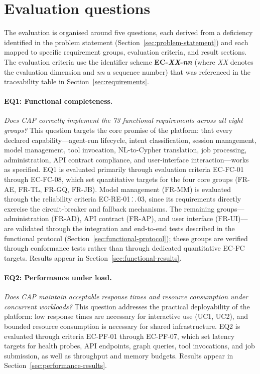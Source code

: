 \documentclass[a4paper,noexaminfo]{sapthesis}
\begin{document}
\section{Evaluation questions}
\label{sec:evaluation-questions}

The evaluation is organised around five questions, each derived from a
deficiency identified in the problem statement
(Section~\ref{sec:problem-statement}) and each mapped to specific
requirement groups, evaluation criteria, and result sections.  The
evaluation criteria use the identifier scheme
\textbf{EC-\emph{XX}-\emph{nn}} (where \emph{XX} denotes the evaluation
dimension and \emph{nn} a sequence number) that was referenced in the
traceability table in Section~\ref{sec:requirements}.

\paragraph{EQ1: Functional completeness.}
\emph{Does CAP correctly implement the 73 functional requirements across
all eight groups?}
This question targets the core promise of the platform: that every declared
capability---agent-run lifecycle, intent classification, session
management, model management, tool invocation, NL-to-Cypher translation,
job processing, administration, API contract compliance, and
user-interface interaction---works as specified.
EQ1 is evaluated primarily through evaluation criteria EC-FC-01 through
EC-FC-08, which set quantitative targets for the four core groups
(FR-AE, FR-TL, FR-GQ, FR-JB).  Model management (FR-MM) is evaluated
through the reliability criteria EC-RE-01\,.\.\,.\,03, since its
requirements directly exercise the circuit-breaker and fallback
mechanisms.  The remaining groups---administration (FR-AD),
API contract (FR-AP), and user interface (FR-UI)---are validated through
the integration and end-to-end tests described in the functional protocol
(Section~\ref{sec:functional-protocol}); these groups are verified
through conformance tests rather than through dedicated quantitative
EC-FC targets.  Results appear in
Section~\ref{sec:functional-results}.

\paragraph{EQ2: Performance under load.}
\emph{Does CAP maintain acceptable response times and resource consumption
under concurrent workloads?}
This question addresses the practical deployability of the platform: low
response times are necessary for interactive use (UC1, UC2), and bounded
resource consumption is necessary for shared infrastructure.  EQ2 is
evaluated through criteria EC-PF-01 through EC-PF-07, which set latency
targets for health probes, API endpoints, graph queries, tool invocations,
and job submission, as well as throughput and memory budgets.  Results
appear in Section~\ref{sec:performance-results}.
\end{document}
